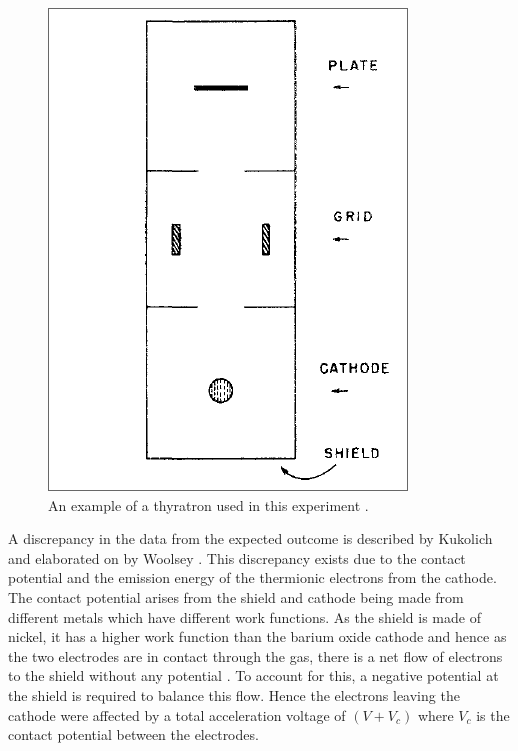 \documentclass[%
reprint,
amsmath,amssymb,
aps,
floatfix
]{revtex4-2}
\begin{document}
	\begin{figure}
		\includegraphics[width=0.65\columnwidth]{thyratron.png}
		\caption{\label{fig:thyratron}An example of a thyratron used in this experiment \cite{kukolich}.}
	\end{figure}
	
	A discrepancy in the data from the expected outcome is described by Kukolich and elaborated on by Woolsey \cite{kukolich} \cite{woolsey}. This discrepancy exists due to the contact potential and the emission energy of the thermionic electrons from the cathode. The contact potential arises from the shield and cathode being made from different metals which have different work functions. As the shield is made of nickel, it has a higher work function than the barium oxide cathode and hence as the two electrodes are in contact through the gas, there is a net flow of electrons to the shield without any potential \cite{woolsey}. To account for this, a negative potential at the shield is required to balance this flow. Hence the electrons leaving the cathode were affected by a total acceleration voltage of $(V + V_c)$ where $V_c$ is the contact potential between the electrodes. \\
	
\end{document}

